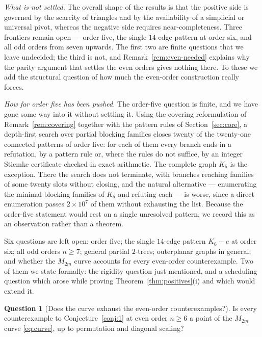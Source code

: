 \documentclass[11pt]{article}
\theoremstyle{plain}
\theoremstyle{definition}
\newtheorem{question}[theorem]{Question}
\begin{document}
\begin{humanblock}
\emph{What is not settled.} The overall shape of the results is that the positive side is governed by
the scarcity of triangles and by the availability of a simplicial or universal pivot, whereas the
negative side requires near-completeness. Three frontiers remain open --- order five, the single
$14$-edge pattern at order six, and all odd orders from seven upwards. The first two are finite
questions that we leave undecided; the third is not, and Remark~\ref{rem:even-needed} explains why the
parity argument that settles the even orders gives nothing there. To these we add the structural
question of how much the even-order construction really forces.

\emph{How far order five has been pushed.} The order-five question is finite, and we have gone some way into it without settling it. Using the covering reformulation of Remark~\ref{rem:covering} together with the pattern rules of Section~\ref{sec:core}, a depth-first search over partial blocking families closes twenty of the twenty-one connected patterns of order five: for each of them every branch ends in a refutation, by a pattern rule or, where the rules do not suffice, by an integer Stiemke certificate checked in exact arithmetic. The complete graph $K_5$  is the exception. There the search does not terminate, with branches reaching families of some twenty slots without closing, and the natural alternative — enumerating the minimal blocking families of $K_5$ and refuting each — is worse, since a direct enumeration passes $2\times 10^7$   of them without exhausting the list. Because the order-five statement would rest on a single unresolved pattern, we record this as an observation rather than a theorem.

Six questions are left open: order five; the single $14$-edge pattern $K_6-e$ at order six; all odd
orders $n\ge7$; general partial $2$-trees; outerplanar graphs in general; and whether the $M_{2m}$
curve accounts for every even-order counterexample. Two of them we state formally: the rigidity
question just mentioned, and a scheduling question which arose while proving
Theorem~\ref{thm:positives}(i) and which would extend it.

\begin{question}[Does the curve exhaust the even-order counterexamples?]\label{q:curve}
Is every counterexample to Conjecture~\ref{conj:1} at even order $n\ge6$ a point of the $M_{2m}$ curve
\eqref{eq:curve}, up to permutation and diagonal scaling?
\end{question}


\end{humanblock}
\end{document}
